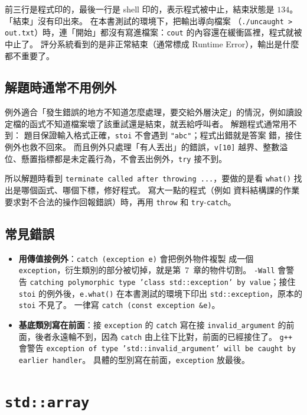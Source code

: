 前三行是程式印的，最後一行是 shell 印的，表示程式被中止，結束狀態是
$134$。 「結束」沒有印出來。 在本書測試的環境下，把輸出導向檔案
（\texttt{./uncaught > out.txt}）時，連「開始」都沒有寫進檔案：\texttt{cout}
的內容還在緩衝區裡，程式就被中止了。 評分系統看到的是非正常結束（通常標成
Runtime Error），輸出是什麼都不重要了。

\subsection{解題時通常不用例外}

例外適合「發生錯誤的地方不知道怎麼處理，要交給外層決定」的情況，例如讀設
定檔的函式不知道檔案壞了該重試還是結束，就丟給呼叫者。 解題程式通常用不到：
題目保證輸入格式正確，\texttt{stoi} 不會遇到 \texttt{"abc"}；程式出錯就是答案
錯，接住例外也救不回來。 而且例外只處理「有人丟出」的錯誤，\texttt{v[10]}
越界、整數溢位、懸置指標都是未定義行為，不會丟出例外，\texttt{try} 接不到。

所以解題時看到 \texttt{terminate called after throwing ...}，要做的是看
\texttt{what()} 找出是哪個函式、哪個下標，修好程式。 寫大一點的程式（例如
資料結構課的作業要求對不合法的操作回報錯誤）時，再用 \texttt{throw} 和
\texttt{try}-\texttt{catch}。

\subsection{常見錯誤}

\begin{itemize}
\item \textbf{用傳值接例外}：\texttt{catch (exception e)} 會把例外物件複製
成一個 \texttt{exception}，衍生類別的部分被切掉，就是第~7~章的物件切割。
\texttt{-Wall} 會警告 \texttt{catching polymorphic type 'class
std::exception' by value}；接住 \texttt{stoi} 的例外後，\texttt{e.what()}
在本書測試的環境下印出 \texttt{std::exception}，原本的 \texttt{stoi} 不見了。
一律寫 \texttt{catch (const exception \&e)}。
\item \textbf{基底類別寫在前面}：接 \texttt{exception} 的 \texttt{catch}
寫在接 \texttt{invalid\_argument} 的前面，後者永遠輪不到，因為
\texttt{catch} 由上往下比對，前面的已經接住了。 \texttt{g++} 會警告
\texttt{exception of type 'std::invalid\_argument' will be caught by earlier
handler}。 具體的型別寫在前面，\texttt{exception} 放最後。
\end{itemize}

\section{\texttt{std::array}}
\label{sec:std-array}

